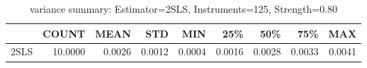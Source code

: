 \begin{table}[ht]
\centering
\caption{variance summary: Estimator=2SLS, Instruments=125, Strength=0.80}
\begin{tabular}{lrrrrrrrr}
\toprule
 & COUNT & MEAN & STD & MIN & 25\% & 50\% & 75\% & MAX \\
\midrule
2SLS & 10.0000 & 0.0026 & 0.0012 & 0.0004 & 0.0016 & 0.0028 & 0.0033 & 0.0041 \\
\bottomrule
\end{tabular}
\end{table}
